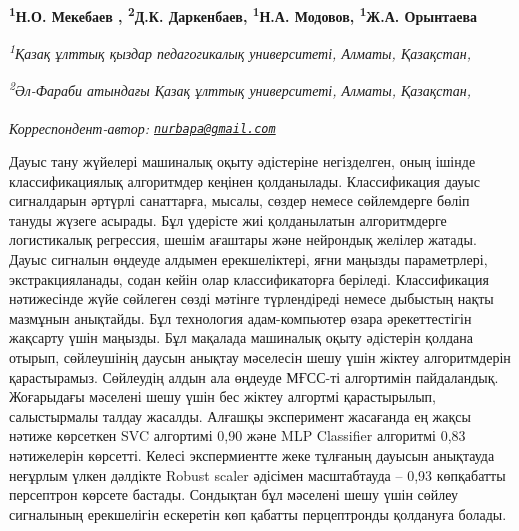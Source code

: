 
\begin{articleheader}

{\bfseries
\textsuperscript{1}Н.О. Мекебаев\textsuperscript{\envelope } \authorid,
\textsuperscript{2}Д.К. Даркенбаев\authorid,
\textsuperscript{1}Н.А. Модовов\authorid,
\textsuperscript{1}Ж.А. Орынтаева\authorid}
\end{articleheader}

\begin{affiliation}
{\em \textsuperscript{1}Қазақ ұлттық қыздар педагогикалық университеті, Алматы, Қазақстан,}

{\em \textsuperscript{2}Әл-Фараби атындағы Қазақ ұлттық университеті, Алматы, Қазақстан,}

\raggedright \textsuperscript{\envelope }{\em Корреспондент-автор: \href{mailto:nurbapa@gmail.com}{\nolinkurl{nurbapa@gmail.com}}}
\end{affiliation}

Дауыс тану жүйелері машиналық оқыту әдістеріне негізделген, оның ішінде
классификациялық алгоритмдер кеңінен қолданылады. Классификация дауыс
сигналдарын әртүрлі санаттарға, мысалы, сөздер немесе сөйлемдерге бөліп
тануды жүзеге асырады. Бұл үдерісте жиі қолданылатын алгоритмдерге
логистикалық регрессия, шешім ағаштары және нейрондық желілер жатады.
Дауыс сигналын өңдеуде алдымен ерекшеліктері, яғни маңызды параметрлері,
экстракцияланады, содан кейін олар классификаторға беріледі.
Классификация нәтижесінде жүйе сөйлеген сөзді мәтінге түрлендіреді
немесе дыбыстың нақты мазмұнын анықтайды. Бұл технология адам-компьютер
өзара әрекеттестігін жақсарту үшін маңызды. Бұл мақалада машиналық оқыту
әдістерін қолдана отырып, сөйлеушінің даусын анықтау мәселесін шешу үшін
жіктеу алгоритмдерін қарастырамыз. Сөйлеудің алдын ала өңдеуде МҒСС-ті
алгортимін пайдаландық. Жоғарыдағы мәселені шешу үшін бес жіктеу
алгортмі қарастырылып, салыстырмалы талдау жасалды. Алғашқы эксперимент
жасағанда ең жақсы нәтиже көрсеткен SVC алгортимі 0,90 және MLP
Classifier алгоритмі 0,83 нәтижелерін көрсетті. Келесі экспермиентте
жеке тұлғаның дауысын анықтауда неғұрлым үлкен дәлдікте Robust scaler
әдісімен масштабтауда -- 0,93 көпқабатты персептрон көрсете бастады.
Сондықтан бұл мәселені шешу үшін сөйлеу сигналының ерекшелігін ескеретін
көп қабатты перцептронды қолдануға болады.

